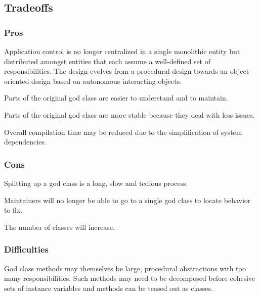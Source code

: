 \documentclass[a4paper,10pt,twoside]{book}
\begin{document}
\subsection*{Tradeoffs}

\subsubsection*{Pros}

\begin{bulletlist}
\item Application control is no longer centralized in a single monolithic entity but distributed amongst entities that each assume a well-defined set of responsibilities. The design evolves from a procedural design towards an object-oriented design based on autonomous interacting objects.

\item Parts of the original god class are easier to understand and to maintain.

\item Parts of the original god class are more stable because they deal with less issues. 

\item Overall compilation time may be reduced due to the simplification of system dependencies.
\end{bulletlist}

\subsubsection*{Cons}

\begin{bulletlist}
\item Splitting up a god class is a long, slow and tedious process.

\item Maintainers will no longer be able to go to a single god class to locate behavior to fix.

\item The number of classes will increase.
\end{bulletlist}

\subsubsection*{Difficulties}

\begin{bulletlist}
\item God class methods may themselves be large, procedural abstractions with too many responsibilities. Such methods may need to be decomposed before cohesive sets of instance variables and methods can be teased out as classes.
\end{bulletlist}
\end{document}
